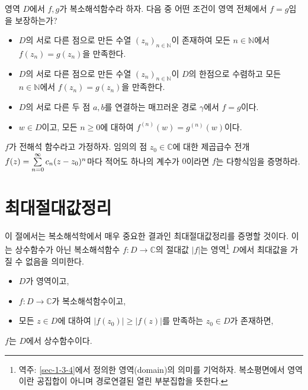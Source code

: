 \begin{salt_exercise} \label{ex-4-24}
영역 $D$에서 $f,g$가 복소해석함수라 하자.
다음 중 어떤 조건이 영역 전체에서 $f=g$임을 보장하는가?
\begin{itemize}
\item[(1)] 
$D$의 서로 다른 점으로 만든 수열 $(z_n)_{n\in\mathbb N}$이 존재하여
모든 $n\in \mathbb N$에서 $f(z_n) = g(z_n)$을 만족한다.
\item[(2)] $D$의 서로 다른 점으로 만든 수열 $(z_n)_{n\in\mathbb N}$이 $D$의 한점으로 수렴하고
모든 $n\in \mathbb N$에서 $f(z_n) = g(z_n)$을 만족한다.
\item[(3)] $D$의 서로 다른 두 점 $a,b$를 연결하는 매끄러운 경로 $\gamma$에서
$f=g$이다.
\item[(4)]  $w\in D$이고, 모든 $n\ge0$에 대하여 $f^{(n)}(w) = g^{(n)}(w)$이다.
\end{itemize}
\end{salt_exercise}

\begin{salt_exercise} \label{ex-4-25}
$f$가 전해석 함수라고 가정하자.
임의의 점 $z_0\in \mathbb C$에 대한 제곱급수 전개
$f(z) = \sum\limits_{n=0}^\infty c_n(z-z_0)^n$마다 적어도 하나의 계수가 $0$이라면 
$f$는 다항식임을 증명하라.
\end{salt_exercise}

\section{최대절대값정리} \label{sec-4-6}

이 절에서는 복소해석학에서 매우 중요한 결과인  최대절대값정리를 증명할 것이다.
이는 상수함수가 아닌 복소해석함수 $f:D\to\mathbb C$의 절대값 $|f|$는 영역\footnote{
역주: \ref{sec-1-3-4}에서 정의한 영역(domain)의 의미를 기억하자.
복소평면에서 영역이란 공집합이 아니며 경로연결된 열린 부분집합을 뜻한다. 
}
 $D$에서
최대값을 가질 수 없음을 의미한다.

\begin{salttheorem} [최대절대값정리] {}{} \label{thm-4-6}

\begin{itemize}
\item[(1)] $D$가 영역이고,
\item[(2)] $f:D\to\mathbb C$가 복소해석함수이고,
\item[(3)] 모든 $z\in D$에 대하여 $|f(z_0)| \ge |f(z)|$를 만족하는 $z_0\in D$가 존재하면,
\end{itemize}
$f$는 $D$에서 상수함수이다.
\end{salttheorem}

